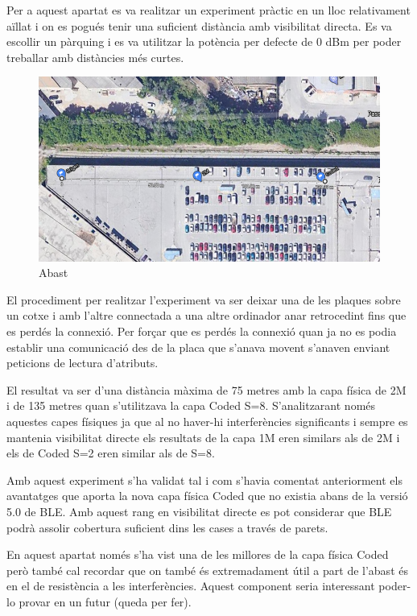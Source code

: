 Per a aquest apartat es va realitzar un experiment pràctic en un lloc relativament aïllat i on es pogués tenir una suficient distància amb visibilitat directa.
Es va escollir un pàrquing i es va utilitzar la potència per defecte de 0 dBm per poder treballar amb distàncies més curtes.

\begin{figure}[!h]
	\begin{center}
		\includegraphics[width=\textwidth]{./images/prova_abast.png}
		\caption{Abast}
	\end{center}
\end{figure}

El procediment per realitzar l'experiment va ser deixar una de les plaques sobre un cotxe i amb l'altre connectada a una altre ordinador anar retrocedint fins que es perdés la connexió.
Per forçar que es perdés la connexió quan ja no es podia establir una comunicació des de la placa que s'anava movent s'anaven enviant peticions de lectura d'atributs.

El resultat va ser d'una distància màxima de 75 metres amb la capa física de 2M i de 135 metres quan s'utilitzava la capa Coded S=8.
S'analitzarant només aquestes capes físiques ja que al no haver-hi interferències significants i sempre es mantenia visibilitat directe els resultats de la capa 1M eren similars als de 2M i els de Coded S=2 eren similar als de S=8.

Amb aquest experiment s'ha validat tal i com s'havia comentat anteriorment els avantatges que aporta la nova capa física Coded que no existia abans de la versió 5.0 de BLE.
Amb aquest rang en visibilitat directe es pot considerar que BLE podrà assolir cobertura suficient dins les cases a través de parets.

En aquest apartat només s'ha vist una de les millores de la capa física Coded però també cal recordar que on també és extremadament útil a part de l'abast és en el de resistència a les interferències.
Aquest component seria interessant poder-lo provar en un futur (queda per fer).


